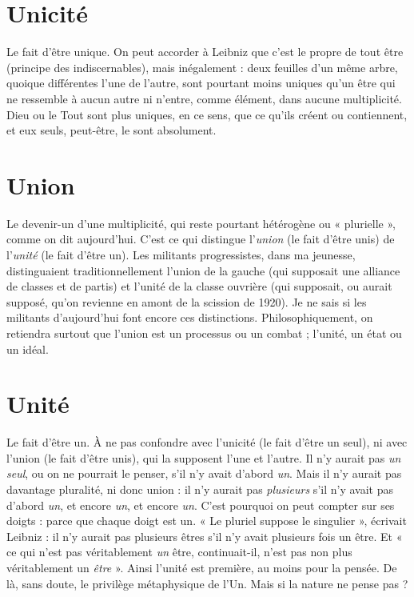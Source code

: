 \section{Unicité}
Le fait d’être unique. On peut accorder à Leibniz que c’est le
propre de tout être (principe des indiscernables), mais inégalement :
deux feuilles d’un même arbre, quoique différentes l’une de l’autre, sont
pourtant moins uniques qu'un être qui ne ressemble à aucun autre ni n’entre,
comme élément, dans aucune multiplicité. Dieu ou le Tout sont plus uniques,
en ce sens, que ce qu'ils créent ou contiennent, et eux seuls, peut-être, le sont
absolument.

\section{Union}
Le devenir-un d’une multiplicité, qui reste pourtant hétérogène ou
« plurielle », comme on dit aujourd’hui. C’est ce qui distingue
l'{\it union} (le fait d’être unis) de l’{\it unité} (le fait d’être un). Les militants progressistes,
dans ma jeunesse, distinguaient traditionnellement l’union de la gauche
(qui supposait une alliance de classes et de partis) et l’unité de la classe ouvrière
(qui supposait, ou aurait supposé, qu’on revienne en amont de la scission de
1920). Je ne sais si les militants d’aujourd’hui font encore ces distinctions. Philosophiquement,
on retiendra surtout que l’union est un processus ou un
combat ; l’unité, un état ou un idéal.

\section{Unité}
Le fait d’être un. À ne pas confondre avec l’unicité (le fait d’être un
seul), ni avec l’union (le fait d’être unis), qui la supposent l’une et
l’autre. Il n’y aurait pas {\it un seul}, ou on ne pourrait le penser, s’il n’y avait
d’abord {\it un}. Mais il n’y aurait pas davantage pluralité, ni donc union : il n’y
aurait pas {\it plusieurs} s’il n’y avait pas d’abord {\it un}, et encore {\it un}, et encore {\it un}.
C’est pourquoi on peut compter sur ses doigts : parce que chaque doigt est un.
« Le pluriel suppose le singulier », écrivait Leibniz : il n’y aurait pas plusieurs
êtres s’il n’y avait plusieurs fois un être. Et « ce qui n’est pas véritablement {\it un}
être, continuait-il, n’est pas non plus véritablement un {\it être} ». Ainsi l’unité est
première, au moins pour la pensée. De là, sans doute, le privilège métaphysique
de l’Un. Mais si la nature ne pense pas ?

